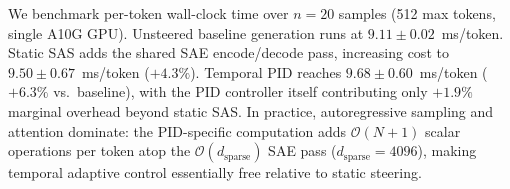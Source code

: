 \documentclass{article}
\theoremstyle{plain}
\begin{document}
We benchmark per-token wall-clock time over $n{=}20$ samples (512 max tokens, single A10G GPU). Unsteered baseline generation runs at $9.11 \pm 0.02$~ms/token. Static SAS adds the shared SAE encode/decode pass, increasing cost to $9.50 \pm 0.67$~ms/token ($+4.3\%$). Temporal PID reaches $9.68 \pm 0.60$~ms/token ($+6.3\%$ vs.\ baseline), with the PID controller itself contributing only $+1.9\%$ marginal overhead beyond static SAS. In practice, autoregressive sampling and attention dominate: the PID-specific computation adds $\mathcal{O}(N + 1)$ scalar operations per token atop the $\mathcal{O}(d_\text{sparse})$ SAE pass ($d_\text{sparse}{=}4096$), making temporal adaptive control essentially free relative to static steering.
\end{document}
